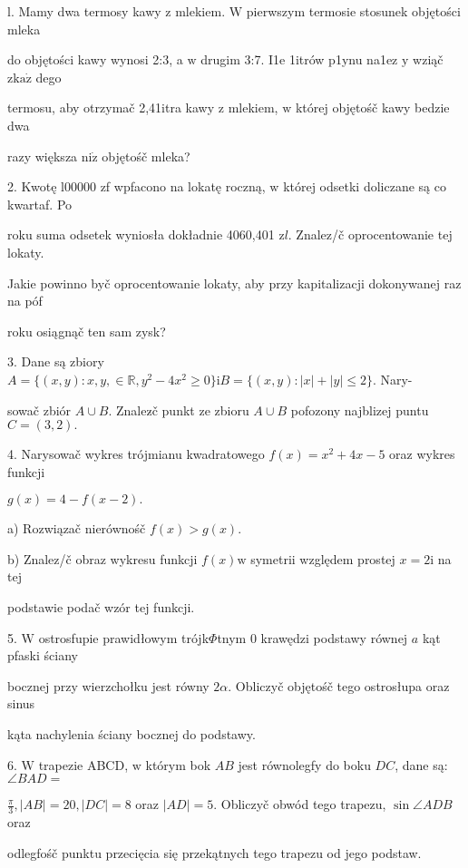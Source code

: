 \documentclass[a4paper,12pt]{article}
\begin{document}
l. Mamy dwa termosy kawy $\mathrm{z}$ mlekiem. $\mathrm{W}$ pierwszym termosie stosunek objętości mleka

do objętości kawy wynosi 2:3, a $\mathrm{w}$ drugim 3:7. I1e 1itrów p1ynu na1ez $\mathrm{y}$ wziąč $\mathrm{z}\mathrm{k}\mathrm{a}\dot{\mathrm{z}}$ dego

termosu, aby otrzymač 2,41itra kawy $\mathrm{z}$ mlekiem, $\mathrm{w}$ której objętośč kawy bedzie dwa

razy większa $\mathrm{n}\mathrm{i}\dot{\mathrm{z}}$ objętośč mleka?

2. Kwotę l00000 zf wpfacono na lokatę roczną, $\mathrm{w}$ której odsetki doliczane są co kwartaf. Po

roku suma odsetek wyniosła dokładnie 4060,401 $\mathrm{z}l$. Znalez/č oprocentowanie tej lokaty.

Jakie powinno byč oprocentowanie lokaty, aby przy kapitalizacji dokonywanej raz na póf

roku osiągnąč ten sam zysk?

3. Dane są zbiory $A=\{(x,y):x,y,\in \mathbb{R},y^{2}-4x^{2}\geq 0\}\mathrm{i}B=\{(x,y):|x|+|y|\leq 2\}$. Nary-

sowač zbiór $A\cup B$. Znalez$\acute{}$č punkt ze zbioru $A\cup B$ pofozony najblizej puntu $C=(3,2).$

4. Narysowač wykres trójmianu kwadratowego $f(x) = x^{2}+4x-5$ oraz wykres funkcji

$g(x)=4-f(x-2).$

a) Rozwiązač nierównośč $f(x)>g(x).$

b) Znalez/č obraz wykresu funkcji $f(x) \mathrm{w}$ symetrii względem prostej $x=2 \mathrm{i}$ na tej

podstawie podač wzór tej funkcji.

5. $\mathrm{W}$ ostrosfupie prawidłowym trójk$\Phi$tnym $0$ krawędzi podstawy równej $a$ kąt pfaski ściany

bocznej przy wierzchołku jest równy $ 2\alpha$. Obliczyč objętośč tego ostrosłupa oraz sinus

kąta nachylenia ściany bocznej do podstawy.

6. $\mathrm{W}$ trapezie ABCD, $\mathrm{w}$ którym bok $AB$ jest równolegfy do boku $DC$, dane są: $\angle BAD=$

$\displaystyle \frac{\pi}{3}, |AB| =20, |DC| =8$ oraz $|AD| =5$. Obliczyč obwód tego trapezu, $\sin\angle ADB$ oraz

odlegfośč punktu przecięcia się przekątnych tego trapezu od jego podstaw.
\end{document}
